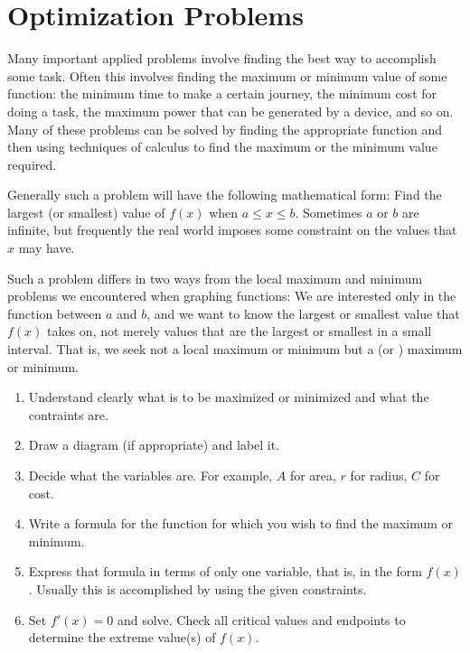 \section{Optimization Problems}\label{sec:Optimization}

Many important applied problems involve finding the best way to
accomplish some task. Often this involves finding the maximum or
minimum value of some function: the minimum time to make a certain
journey, the minimum cost for doing a task, the maximum power that can
be generated by a device, and so on. Many of these problems can be
solved by finding the appropriate function and then using techniques
of calculus to find the maximum or the minimum value required.

Generally such a problem will have the following mathematical form:
Find the largest (or smallest) value of $f(x)$ when $a\le x\le
b$. Sometimes $a$ or $b$ are infinite, but frequently the real world
imposes some constraint on the values that $x$ may have.

Such a problem differs in two ways from the local maximum and minimum
problems we encountered when graphing functions: We are interested
only in the function between $a$ and $b$, and we want to know the
largest or smallest value that $f(x)$ takes on, not merely values that
are the largest or smallest in a small interval. That is, we seek not
a local maximum or minimum but a  (or )
maximum or minimum.
 
\begin{formulabox}
\begin{enumerate}
	\item Understand clearly what is to be maximized or minimized and what the contraints are.
	\item Draw a diagram (if appropriate) and label it.
	\item Decide what the variables are. For example, $A$ for area, $r$ for radius, $C$ for cost.
	\item Write a formula for the function for which you wish to find the maximum or minimum.
	\item Express that formula in terms of only one variable, that is, in the form $f(x)$. Usually this
				is accomplished by using the given constraints.
	\item Set $f'(x)=0$ and solve. Check all critical values and endpoints to determine the extreme value(s) of $f(x)$.
\end{enumerate}
\end{formulabox}

